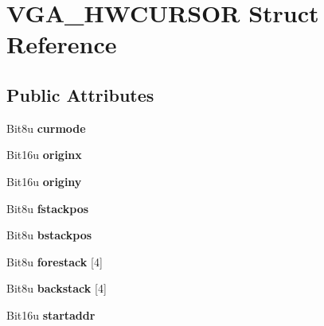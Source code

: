 \hypertarget{structVGA__HWCURSOR}{\section{V\-G\-A\-\_\-\-H\-W\-C\-U\-R\-S\-O\-R Struct Reference}
\label{structVGA__HWCURSOR}
}
\subsection*{Public Attributes}
\begin{DoxyCompactItemize}
\item 
\hypertarget{structVGA__HWCURSOR_a9db35a70aca91b32cccb3782b161bd0d}{Bit8u {\bfseries curmode}}\label{structVGA__HWCURSOR_a9db35a70aca91b32cccb3782b161bd0d}

\item 
\hypertarget{structVGA__HWCURSOR_a953a596025aa74fd50d32a55703a5fdd}{Bit16u {\bfseries originx}}\label{structVGA__HWCURSOR_a953a596025aa74fd50d32a55703a5fdd}

\item 
\hypertarget{structVGA__HWCURSOR_a2206322fbe6da1bc9a1a373c635c1a4b}{Bit16u {\bfseries originy}}\label{structVGA__HWCURSOR_a2206322fbe6da1bc9a1a373c635c1a4b}

\item 
\hypertarget{structVGA__HWCURSOR_aadb22639b1c37c27e40a39d7170df78a}{Bit8u {\bfseries fstackpos}}\label{structVGA__HWCURSOR_aadb22639b1c37c27e40a39d7170df78a}

\item 
\hypertarget{structVGA__HWCURSOR_ab49677f0de28b9a71ef6c8488c1d2abd}{Bit8u {\bfseries bstackpos}}\label{structVGA__HWCURSOR_ab49677f0de28b9a71ef6c8488c1d2abd}

\item 
\hypertarget{structVGA__HWCURSOR_acc4854b2283d384c22bb8e16496ddc53}{Bit8u {\bfseries forestack} \mbox{[}4\mbox{]}}\label{structVGA__HWCURSOR_acc4854b2283d384c22bb8e16496ddc53}

\item 
\hypertarget{structVGA__HWCURSOR_a4006852ba1583ae68b0052056c24e024}{Bit8u {\bfseries backstack} \mbox{[}4\mbox{]}}\label{structVGA__HWCURSOR_a4006852ba1583ae68b0052056c24e024}

\item 
\hypertarget{structVGA__HWCURSOR_ad5862e40111a1bb7b7a30b08f4760c1c}{Bit16u {\bfseries startaddr}}\label{structVGA__HWCURSOR_ad5862e40111a1bb7b7a30b08f4760c1c}


\end{DoxyCompactItemize}
